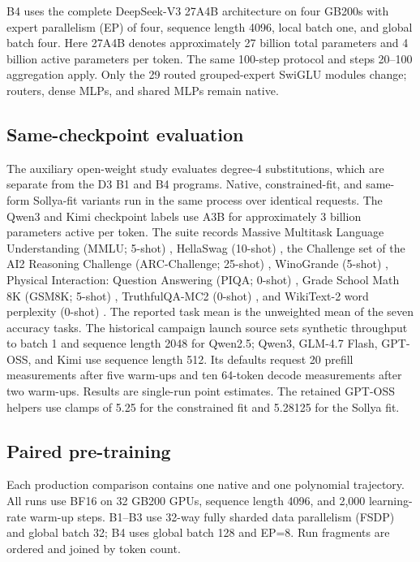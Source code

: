 \documentclass[11pt]{article}
\begin{document}
B4 uses the complete DeepSeek-V3 27A4B architecture on four GB200s with expert
parallelism (EP) of four, sequence length 4096, local batch one, and global
batch four. Here 27A4B denotes approximately 27 billion total parameters and 4
billion active parameters per token. The same 100-step protocol and steps
20--100 aggregation apply. Only the 29 routed grouped-expert SwiGLU modules
change; routers, dense MLPs, and shared MLPs remain native.

\subsection{Same-checkpoint evaluation}

The auxiliary open-weight study evaluates degree-4 substitutions, which are
separate from the D3 B1 and B4 programs. Native, constrained-fit, and
same-form Sollya-fit variants run in the same process over identical requests.
The Qwen3 and Kimi checkpoint labels use A3B for approximately 3 billion
parameters active per token.
The suite records Massive Multitask Language Understanding (MMLU; 5-shot)
\cite{hendrycks2021mmlu}, HellaSwag (10-shot) \cite{zellers2019hellaswag}, the
Challenge set of the AI2 Reasoning Challenge (ARC-Challenge; 25-shot)
\cite{clark2018arc}, WinoGrande (5-shot) \cite{sakaguchi2020winogrande},
Physical Interaction: Question Answering (PIQA; 0-shot) \cite{bisk2020piqa},
Grade School Math 8K (GSM8K; 5-shot) \cite{cobbe2021gsm8k}, TruthfulQA-MC2
(0-shot) \cite{lin2022truthfulqa}, and WikiText-2 word perplexity (0-shot)
\cite{merity2017wikitext}. The reported task mean is the unweighted mean of the
seven accuracy tasks. The historical campaign launch source sets synthetic
throughput to batch 1 and sequence length 2048 for Qwen2.5; Qwen3, GLM-4.7
Flash, GPT-OSS, and Kimi use sequence length 512. Its defaults request 20
prefill measurements after five warm-ups and ten 64-token decode measurements
after two warm-ups. Results are single-run point estimates.
The retained GPT-OSS helpers use clamps of 5.25 for the constrained fit and
5.28125 for the Sollya fit.

\subsection{Paired pre-training}

Each production comparison contains one native and one polynomial trajectory.
All runs use BF16 on 32 GB200 GPUs, sequence length 4096, and 2,000 learning-rate
warm-up steps. B1--B3 use 32-way fully sharded data parallelism (FSDP) and
global batch 32; B4 uses global batch 128 and EP=8. Run fragments are ordered
and joined by token count.
\end{document}
